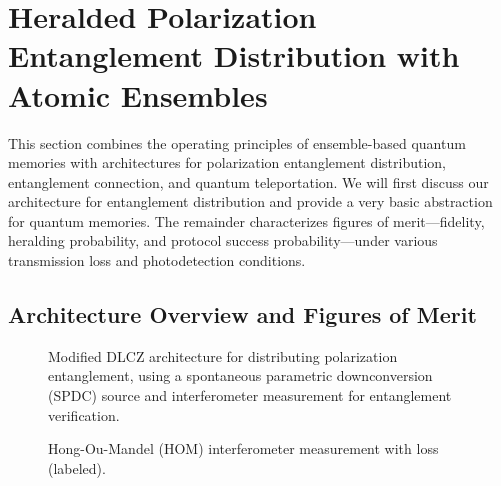 \documentclass[aps,twocolumn,secnumarabic,amsmath,amssymb,pra,groupedaddress,
showpacs, showkeys]{revtex4-1}
\newcommand{\ket}[1]{\left|#1\right\rangle}
\newcommand{\abs}[1]{\left|#1\right|}
\begin{document}

\section{Heralded Polarization Entanglement Distribution with Atomic
  Ensembles\label{chap:herald}}

This section combines the operating principles of ensemble-based quantum
memories with architectures for polarization entanglement distribution,
entanglement connection, and quantum teleportation. We will first discuss our
architecture for entanglement distribution and provide a very basic abstraction
for quantum memories. The remainder characterizes figures of merit---fidelity,
heralding probability, and protocol success probability---under various
transmission loss and photodetection conditions.

\subsection{Architecture Overview and Figures of Merit\label{sec:herald:overview}}

\begin{figure}[t]
	\centering
	\resizebox{6.50in}{!}{}
	\caption{Modified DLCZ architecture for distributing polarization entanglement, using a spontaneous parametric downconversion (SPDC) source and  interferometer measurement for entanglement verification.}
	\label{fig:channel_model}
\end{figure}

\begin{figure}[htb]
	\centering
	\resizebox{6.50in}{!}{}
	\caption{Hong-Ou-Mandel (HOM) interferometer measurement with loss (labeled).}
	\label{fig:channel_loss_model}
\end{figure}
\end{document}
